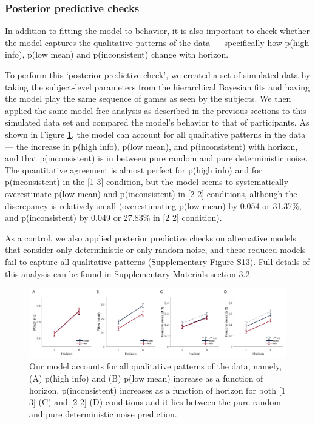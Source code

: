 \documentclass[12pt]{article}
\begin{document}
{\subsubsection*{Posterior predictive checks}
In addition to fitting the model to behavior, it is also important to check whether the model captures the qualitative patterns of the data \citep{Wilson2019} --- specifically how p(high info), p(low mean) and p(inconsistent) change with horizon.

To perform this `posterior predictive check', we created a set of simulated data by taking the subject-level parameters from the hierarchical Bayesian fits and having the model play the same sequence of games as seen by the subjects. We then applied the same model-free analysis as described in the previous sections to this simulated data set and compared the model's behavior to that of participants. As shown in Figure \ref{fig:mb3}, the model can account for all qualitative patterns in the data --- the increase in p(high info), p(low mean), and p(inconsistent) with horizon, and that p(inconsistent) is in between pure random and pure deterministic noise. The quantitative agreement is almost perfect for p(high info) and for p(inconsistent) in the [1 3] condition, but the model seems to systematically overestimate p(low mean) and p(inconsistent) in [2 2] conditions, although the discrepancy is relatively small (overestimating p(low mean) by 0.054 or 31.37\%, and p(inconsistent) by 0.049 or 27.83\% in [2 2] condition). 

As a control, we also applied posterior predictive checks on alternative models that consider only deterministic or only random noise, and these reduced models fail to capture all qualitative patterns (Supplementary Figure S13). Full details of this analysis can be found in Supplementary Materials section 3.2.  

\begin{figure}[H]
\begin{center}
	\includegraphics[width=1\textwidth]{figures/RDBayes_2noise_modelA.jpg}
	\caption{
		Our model accounts for all qualitative patterns of the data, namely, (A) p(high info) and (B) p(low mean) increase as a function of horizon, p(inconsistent) increases as a function of horizon for both [1 3] (C) and [2 2] (D) conditions and it lies between the pure random and pure deterministic noise prediction.}
	\label{fig:mb3}
\end{center}
\end{figure}


}
\end{document}
